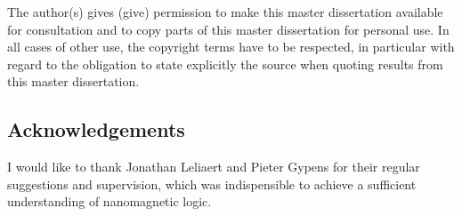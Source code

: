 \documentclass[11pt,a4paper,english]{article}
\begin{document}
\shipout\null %

\newpage
{}

\begin{center}
    The author(s) gives (give) permission to make this master dissertation available for consultation and to copy parts of this master dissertation for personal use. In all cases of other use, the copyright terms have to be respected, in particular with regard to the obligation to state explicitly the source when quoting results from this master dissertation.
\end{center}
\subsection*{Acknowledgements} %
I would like to thank Jonathan Leliaert and Pieter Gypens for their regular suggestions and supervision, which was indispensible to achieve a sufficient understanding of nanomagnetic logic.
\end{document}
